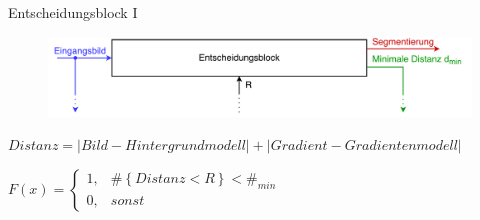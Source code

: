 \documentclass[hyperref={pdfpagelabels=false}]{beamer}
\begin{document}
\begin{frame}{Entscheidungsblock I}
	\begin{figure}
		\centering
		\includegraphics[width=\linewidth]{./Bilder/PDF/decision_block.pdf}
	\end{figure}

	\begin{center}
		\small
		$ Distanz = | Bild - Hintergrundmodell | + | Gradient - Gradientenmodell | $
	\end{center}
	
	\vspace{2em}
	
	$ F(x) = \left\{\begin{array}{ll} 1, & \#\left\{ Distanz < R \right\} < \#_{min} \\
				0, & sonst\end{array}\right. $
\end{frame}
\end{document}
